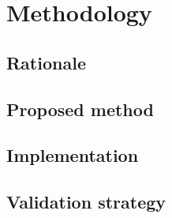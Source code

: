 %
%
%
%
\chapter{Methodology}
\label{ch:methodology}

\section{Rationale}
\label{sec:method-rationale}

\section{Proposed method}
\label{sec:method-proposed}

\section{Implementation}
\label{sec:method-implementation}

\section{Validation strategy}
\label{sec:method-validation}
